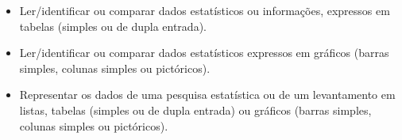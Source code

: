 

\begin{itemize}
\item Ler/identificar ou comparar dados estatísticos ou informações,
expressos em tabelas (simples ou de dupla entrada).

\item Ler/identificar ou comparar dados estatísticos expressos em gráficos
(barras simples, colunas simples ou pictóricos).

\item Representar os dados de uma pesquisa estatística ou de um levantamento
em listas, tabelas (simples ou de dupla entrada) ou gráficos (barras
simples, colunas simples ou pictóricos).
\end{itemize}



